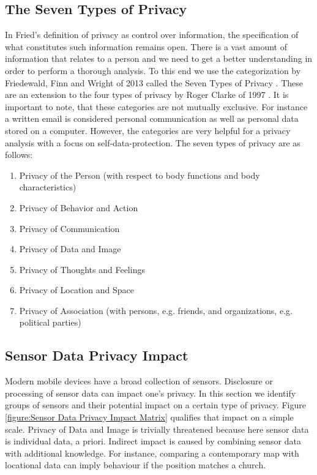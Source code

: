 \documentclass[runningheads,a4paper]{llncs}
\begin{document}
\subsection{The Seven Types of Privacy}
\label{sec:privacytypes}

In Fried's definition of privacy as control over information, the specification of what constitutes such information remains open. There is a vast amount of information that relates to a person and we need to get a better understanding in order to perform a thorough analysis. To this end we use the categorization by Friedewald, Finn and Wright of 2013 called the Seven Types of Privacy \cite{7ToP}. These are an extension to the four types of privacy by Roger Clarke of 1997 \cite{RClarke:4ToP}. It is important to note, that these categories are not mutually exclusive. For instance a written email is considered personal communication as well as personal data stored on a computer. However, the categories are very helpful for a privacy analysis with a focus on self-data-protection.
The seven types of privacy are as follows:
\begin{enumerate}
	\item Privacy of the Person (with respect to body functions and body characteristics)
	\item Privacy of Behavior and Action
	\item Privacy of Communication
	\item Privacy of Data and Image
	\item Privacy of Thoughts and Feelings
	\item Privacy of Location and Space 
	\item Privacy of Association (with persons, e.g. friends, and organizations, e.g. political parties)
\end{enumerate}



\subsection{Sensor Data Privacy Impact}
\label{sec:SensorPrivacyImpact}

Modern mobile devices have a broad collection of sensors.
Disclosure or processing of sensor data can impact one's privacy.
In this section we identify groups of sensors and their potential impact on a certain type of privacy.
Figure \ref{figure:Sensor Data Privacy Impact Matrix} qualifies that impact on a simple scale.
Privacy of Data and Image is trivially threatened because here sensor data is individual data, a priori.
Indirect impact is caused by combining sensor data with additional knowledge.
For instance, comparing a contemporary map with locational data can imply behaviour if the position matches a church.
\end{document}
